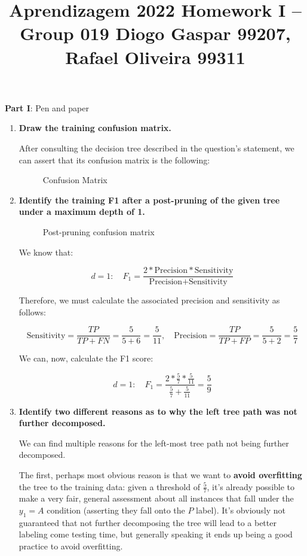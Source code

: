 \documentclass[12pt]{article}
\title{\large{Aprendizagem 2022}\vskip 0.2cm Homework I -- Group 019\vskip 0.2cm Diogo Gaspar 99207, Rafael Oliveira 99311}
\date{}
\begin{document}
\maketitle
\center\large{\vskip -2.5cm\textbf{Part I}: Pen and paper}
\begin{enumerate}[leftmargin=\labelsep]
  \item \textbf{Draw the training confusion matrix.}

        After consulting the decision tree described in the question's statement,
        we can assert that its confusion matrix is the following:

        \begin{figure}[htpb]
          \centering
          
          \caption{Confusion Matrix}
        \end{figure}

  \item \textbf{Identify the training F1 after a post-pruning of the given tree under a maximum depth of 1.}

        \begin{figure}[htpb]
          \centering
          
          \caption{Post-pruning confusion matrix}
        \end{figure}

        We know that:

        $$
          d = 1: \quad F_1 = \frac{2 * \text{Precision} * \text{Sensitivity}}{\text{Precision} + \text{Sensitivity}}
        $$

        Therefore, we must calculate the associated precision and sensitivity as follows:

$$
\text{Sensitivity} = \frac{TP}{TP + FN} = \frac{5}{5 + 6} = \frac{5}{11}, \quad \text{Precision} = \frac{TP}{TP + FP}= \frac{5}{5 + 2} = \frac{5}{7}
$$

        We can, now, calculate the F1 score:

        $$
          d = 1: \quad F_1 = \frac{2 * \frac{5}{7} * \frac{5}{11}}{\frac{5}{7} + \frac{5}{11}} = \frac{5}{9}
        $$

  \item \textbf{Identify two different reasons as to why the left tree path was not further decomposed.}

        We can find multiple reasons for the left-most tree path not being further decomposed.

        The first, perhaps most obvious reason is that we want to \textbf{avoid overfitting} the
        tree to the training data: given a threshold of $\frac{5}{7}$, it's already possible
        to make a very fair, general assessment about all instances that fall under the $y_1 = A$
        condition (asserting they fall onto the $P$ label). It's obviously not guaranteed
        that not further decomposing the tree will lead to a better labeling come testing time,
        but generally speaking it ends up being a good practice to avoid overfitting.


\end{enumerate}
\end{document}
